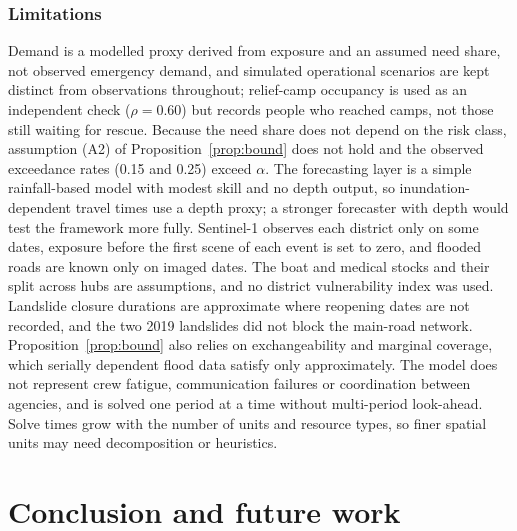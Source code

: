 \documentclass[pdflatex,sn-basic]{sn-jnl}
\theoremstyle{plain}%
\theoremstyle{remark}%
\theoremstyle{definition}%
\begin{document}
\subsubsection{Limitations}
 Demand is a modelled proxy derived from exposure and an assumed need share, not observed emergency demand, and simulated operational scenarios are kept distinct from observations throughout; relief-camp occupancy is used as an independent check ($\rho = 0.60$) but records people who reached camps, not those still waiting for rescue. Because the need share does not depend on the risk class, assumption (A2) of Proposition~\ref{prop:bound} does not hold and the observed exceedance rates (0.15 and 0.25) exceed $\alpha$. The forecasting layer is a simple rainfall-based model with modest skill and no depth output, so inundation-dependent travel times use a depth proxy; a stronger forecaster with depth would test the framework more fully. Sentinel-1 observes each district only on some dates, exposure before the first scene of each event is set to zero, and flooded roads are known only on imaged dates. The boat and medical stocks and their split across hubs are assumptions, and no district vulnerability index was used. Landslide closure durations are approximate where reopening dates are not recorded, and the two 2019 landslides did not block the main-road network. Proposition~\ref{prop:bound} also relies on exchangeability and marginal coverage, which serially dependent flood data satisfy only approximately. The model does not represent crew fatigue, communication failures or coordination between agencies, and is solved one period at a time without multi-period look-ahead. Solve times grow with the number of units and resource types, so finer spatial units may need decomposition or heuristics.

\section{Conclusion and future work}\label{sec:conclusion}
\end{document}
